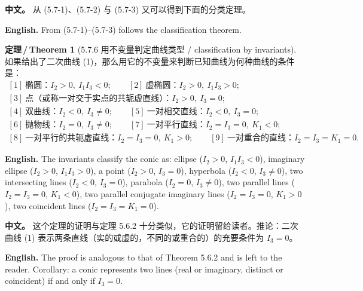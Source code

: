 \documentclass[UTF8,11pt,a4paper]{ctexart}
\newcommand{\APS}[2]{\par\noindent\textbf{中文。} #1\par\noindent\textbf{English.} #2\par\smallskip}
\newcommand{\EN}[1]{\par\noindent \textbf{English.} #1\par}
\theoremstyle{definition}
\newtheorem*{theorem}{定理\,/\,Theorem}
\begin{document}
\APS{从 (5.7-1)、(5.7-2) 与 (5.7-3) 又可以得到下面的分类定理。}{From (5.7-1)--(5.7-3) follows the classification theorem.}

\begin{theorem}[5.7.6 用不变量判定曲线类型 / classification by invariants]\label{thm:inv-class}
如果给出了二次曲线 (1)，那么用它的不变量来判断已知曲线为何种曲线的条件是：
\[
\begin{gathered}
{[1]}\ \text{椭圆：}I_2>0,\ I_1I_3<0;\qquad
[2]\ \text{虚椭圆：}I_2>0,\ I_1I_3>0;\\
[3]\ \text{点（或称一对交于实点的共轭虚直线）：}I_2>0,\ I_3=0;\\
[4]\ \text{双曲线：}I_2<0,\ I_3\ne0;\qquad
[5]\ \text{一对相交直线：}I_2<0,\ I_3=0;\\
[6]\ \text{抛物线：}I_2=0,\ I_3\ne0;\qquad
[7]\ \text{一对平行直线：}I_2=I_3=0,\ K_1<0;\\
[8]\ \text{一对平行的共轭虚直线：}I_2=I_3=0,\ K_1>0;\qquad
[9]\ \text{一对重合的直线：}I_2=I_3=K_1=0.
\end{gathered}
\]
\EN{The invariants classify the conic as: ellipse ($I_2>0$, $I_1I_3<0$), imaginary ellipse ($I_2>0$, $I_1I_3>0$), a point ($I_2>0$, $I_3=0$), hyperbola ($I_2<0$, $I_3\ne0$), two intersecting lines ($I_2<0$, $I_3=0$), parabola ($I_2=0$, $I_3\ne0$), two parallel lines ($I_2=I_3=0$, $K_1<0$), two parallel conjugate imaginary lines ($I_2=I_3=0$, $K_1>0$), two coincident lines ($I_2=I_3=K_1=0$).}
\end{theorem}

\APS{这个定理的证明与定理 5.6.2 十分类似，它的证明留给读者。推论：二次曲线 (1) 表示两条直线（实的或虚的，不同的或重合的）的充要条件为 $I_3=0$。}{The proof is analogous to that of Theorem 5.6.2 and is left to the reader. Corollary: a conic represents two lines (real or imaginary, distinct or coincident) if and only if $I_3=0$.}
\end{document}
